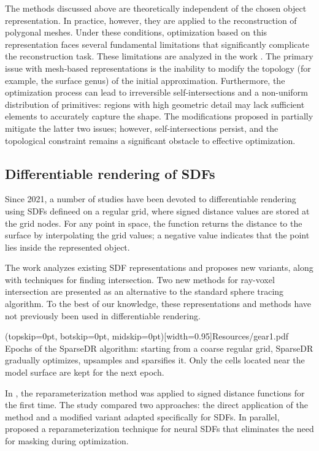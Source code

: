 \documentclass{ieeeaccess}
\begin{document}
The methods discussed above are theoretically independent of the chosen object representation. In practice, however, they are applied to the reconstruction of polygonal meshes. Under these conditions, optimization based on this representation faces several fundamental limitations that significantly complicate the reconstruction task. These limitations are analyzed in the work \cite{Nicolet}. The primary issue with mesh-based representations is the inability to modify the topology (for example, the surface genus) of the initial approximation. Furthermore, the optimization process can lead to irreversible self-intersections and a non-uniform distribution of primitives: regions with high geometric detail may lack sufficient elements to accurately capture the shape. The modifications proposed in \cite{Nicolet} partially mitigate the latter two issues; however, self-intersections persist, and the topological constraint remains a significant obstacle to effective optimization.

\subsection{Differentiable rendering of SDFs}

Since 2021, a number of studies have been devoted to differentiable rendering using SDFs defineed on a regular grid, where signed distance values are stored at the grid nodes. For any point in space, the function returns the distance to the surface by interpolating the grid values; a negative value indicates that the point lies inside the represented object.

The work \cite{HanssonSoderlund} analyzes existing SDF representations and proposes new variants, along with techniques for finding intersection. Two new methods for ray-voxel intersection are presented as an alternative to the standard sphere tracing algorithm. To the best of our knowledge, these representations and methods have not previously been used in differentiable rendering.

\Figure[h](topskip=0pt, botskip=0pt, midskip=0pt)[width=0.95\textwidth]{Resources/gear1.pdf} {
    Epochs of the SparseDR algorithm: starting from a coarse regular grid, SparseDR gradually optimizes, upsamples and sparsifies it. Only the cells located near the model surface are kept for the next epoch. \label{figSparseDR}
}

In \cite{DRSDF}, the reparameterization method was applied to signed distance functions for the first time. The study compared two approaches: the direct application of the method \cite{Reparam} and a modified variant adapted specifically for SDFs. In parallel, \cite{NeuDRSDF} proposed a reparameterization technique for neural SDFs that eliminates the need for masking during optimization.
\end{document}
